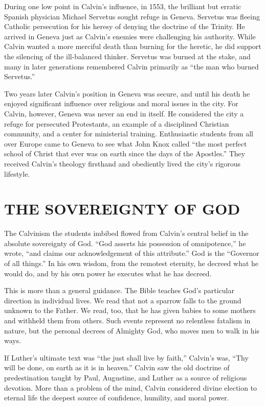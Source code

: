 During one low point in Calvin’s influence, in 1553, the brilliant but erratic Spanish physician
Michael Servetus sought refuge in Geneva. Servetus was fleeing Catholic persecution for his heresy
of denying the doctrine of the Trinity. He arrived in Geneva just as Calvin’s enemies were
challenging his authority. While Calvin wanted a more merciful death than burning for the heretic,
he did support the silencing of the ill-balanced thinker. Servetus was burned at the stake, and many
in later generations remembered Calvin primarily as “the man who burned Servetus.”

Two years later Calvin’s position in Geneva was secure, and until his death he enjoyed significant
influence over religious and moral issues in the city. For Calvin, however, Geneva was never an end
in itself. He considered the city a refuge for persecuted Protestants, an example of a disciplined
Christian community, and a center for ministerial training. Enthusiastic students from all over
Europe came to Geneva to see what John Knox called “the most perfect school of Christ that ever was
on earth since the days of the Apostles.” They received Calvin’s theology firsthand and obediently
lived the city’s rigorous lifestyle.

\section{THE SOVEREIGNTY OF GOD}

The Calvinism the students imbibed flowed from Calvin’s central belief in the absolute sovereignty
of God. “God asserts his possession of omnipotence,” he wrote, “and claims our acknowledgement of
this attribute.” God is the “Governor of all things.” In his own wisdom, from the remotest eternity,
he decreed what he would do, and by his own power he executes what he has decreed.

This is more than a general guidance. The Bible teaches God’s particular direction in individual
lives. We read that not a sparrow falls to the ground unknown to the Father. We read, too, that he
has given babies to some mothers and withheld them from others. Such events represent no relentless
fatalism in nature, but the personal decrees of Almighty God, who moves men to walk in his ways.

If Luther’s ultimate text was “the just shall live by faith,” Calvin’s was, “Thy will be done, on
earth as it is in heaven.” Calvin saw the old doctrine of predestination taught by Paul, Augustine,
and Luther as a source of religious devotion. More than a problem of the mind, Calvin considered
divine election to eternal life the deepest source of confidence, humility, and moral power.


